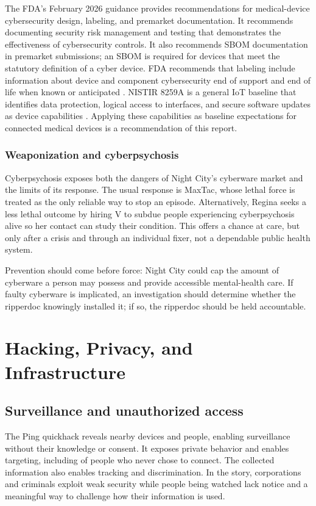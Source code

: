 \documentclass{article}%
\begin{document}
The FDA's February 2026 guidance provides recommendations for medical-device cybersecurity design, labeling, and premarket documentation. It recommends documenting security risk management and testing that demonstrates the effectiveness of cybersecurity controls. It also recommends SBOM documentation in premarket submissions; an SBOM is required for devices that meet the statutory definition of a cyber device. FDA recommends that labeling include information about device and component cybersecurity end of support and end of life when known or anticipated \cite{FDA2026}. NISTIR 8259A is a general IoT baseline that identifies data protection, logical access to interfaces, and secure software updates as device capabilities \cite{NIST2020}. Applying these capabilities as baseline expectations for connected medical devices is a recommendation of this report.

\subsubsection{Weaponization and cyberpsychosis}
Cyberpsychosis exposes both the dangers of Night City's cyberware market and the limits of its response. The usual response is MaxTac, whose lethal force is treated as the only reliable way to stop an episode. Alternatively, Regina seeks a less lethal outcome by hiring V to subdue people experiencing cyberpsychosis alive so her contact can study their condition. This offers a chance at care, but only after a crisis and through an individual fixer, not a dependable public health system.

Prevention should come before force: Night City could cap the amount of cyberware a person may possess and provide accessible mental-health care. If faulty cyberware is implicated, an investigation should determine whether the ripperdoc knowingly installed it; if so, the ripperdoc should be held accountable.

\section{Hacking, Privacy, and Infrastructure}
\subsection{Surveillance and unauthorized access}
The Ping quickhack reveals nearby devices and people, enabling surveillance without their knowledge or consent. It exposes private behavior and enables targeting, including of people who never chose to connect. The collected information also enables tracking and discrimination. In the story, corporations and criminals exploit weak security while people being watched lack notice and a meaningful way to challenge how their information is used.
\end{document}

